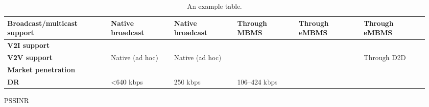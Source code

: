 \begin{table}[h!]
\begin{tabulary}{\columnwidth}{L|L|L|L|L|L}
	\bf{Broadcast/multicast support} & Native broadcast                                      & Native broadcast                                      & Through MBMS                     & Through eMBMS            & Through eMBMS             \\\hline
	\bf{V2I support}                 & \ok                                                   & \ok                                                   & \ok                              & \ok                      & \ok                       \\\hline
	\bf{V2V support}                 & Native (ad hoc)                                       & Native (ad hoc)                                       & \ko                              & \ko                      & Through D2D               \\\hline
	\bf{Market penetration}          & \ok                                                   & \ko                                                   & \ok                              & \ok                      & \ok                       \\\hline
	\bf{\ac{DR}}               	     & <640 kbps                                        & 250 kbps                                              & 106–424 kbps                              & \ok                      & \ok                       \\\hline
	\end{tabulary}
	\caption{\label{tab:Tableppp} An example table.}
\end{table}



\clearpage
\newpage
\ac{PS}\ac{SINR}

